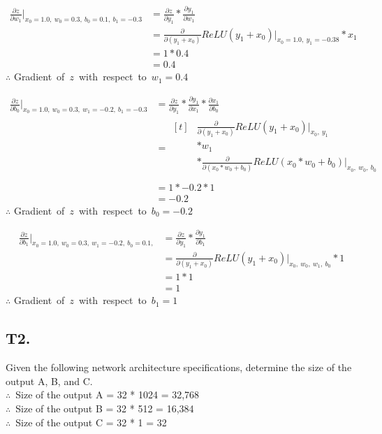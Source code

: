 \documentclass[12pt]{article}
\begin{document}
\begin{align*}
    \frac{\partial z}{\partial w_1}\Big|_{x_0=1.0,\ w_0=0.3,\ b_0=0.1,\ b_1=-0.3}
    &= \frac{\partial z}{\partial y_1} * \frac{\partial y_1}{\partial w_1} \\
    &= \frac{\partial}{\partial (y_1+x_0)} ReLU(y_1 + x_0)\Big|_{x_0=1.0,\ y_1=-0.38} * x_1 \\
    &= 1 * 0.4 \\
    &= 0.4
\end{align*}
$\therefore$ Gradient\ of\ $z$\ with\ respect\ to\ $w_1 = 0.4$

\newpage
\begin{align*}
    \frac{\partial z}{\partial b_0}\Big|_{x_0=1.0,\ w_0=0.3,\ w_1=-0.2,\ b_1=-0.3}
    & = \frac{\partial z}{\partial y_1} * \frac{\partial y_1}{\partial x_1} * \frac{\partial x_1}{\partial b_0} \\
    &= \begin{aligned}[t]
        & \frac{\partial}{\partial (y_1+x_0)} ReLU(y_1 + x_0)\Big|_{x_0,\ y_1} \\
        & * w_1 \\
        & * \frac{\partial}{\partial (x_0*w_0+b_0)} ReLU(x_0*w_0+b_0)\Big|_{x_0,\ w_0,\ b_0} \\
        \end{aligned} \\
    &= 1 * -0.2 * 1 \\
    &= -0.2
\end{align*}
$\therefore$ Gradient\ of\ $z$\ with\ respect\ to\ $b_0 = -0.2$

\begin{align*}
    \frac{\partial z}{\partial b_1}\Big|_{x_0=1.0,\ w_0=0.3,\ w_1=-0.2,\ b_0=0.1,}
    & = \frac{\partial z}{\partial y_1} * \frac{\partial y_1}{\partial b_1} \\
    &= \frac{\partial}{\partial (y_1+x_0)} ReLU(y_1 + x_0)\Big|_{x_0,\ w_0,\ w_1,\ b_0} * 1 \\
    &= 1 * 1 \\
    &= 1
\end{align*}
$\therefore$ Gradient\ of\ $z$\ with\ respect\ to\ $b_1 = 1$

\newpage
\subsection*{T2.}
\quad Given the following network architecture specifications, determine the size of the output A, B, and C.
\vspace{3mm} \\
$\therefore$\ Size of the output A = 32 * 1024 = 32,768 \\
$\therefore$\ Size of the output B = 32 * 512 = 16,384 \\
$\therefore$\ Size of the output C = 32 * 1 = 32
\end{document}
